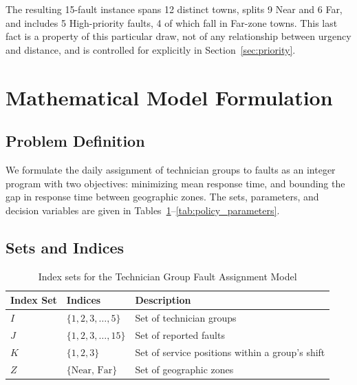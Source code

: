 \documentclass[11pt]{article}
\begin{document}
The resulting 15-fault instance spans 12 distinct towns, splits 9 Near and 6 Far, and includes 5 High-priority faults, 4 of which fall in Far-zone towns. This last fact is a property of this particular draw, not of any relationship between urgency and distance, and is controlled for explicitly in Section~\ref{sec:priority}.

\section*{Mathematical Model Formulation}

\subsection*{Problem Definition}
We formulate the daily assignment of technician groups to faults as an integer program with two objectives: minimizing mean response time, and bounding the gap in response time between geographic zones. The sets, parameters, and decision variables are given in Tables~\ref{tab:index_sets}--\ref{tab:policy_parameters}.

\subsection*{Sets and Indices}
\begin{table}[h!]
\centering
\caption{Index sets for the Technician Group Fault Assignment Model}
\label{tab:index_sets}
\begin{tabular}{l l l}
\toprule
\textbf{Index Set} & \textbf{Indices} & \textbf{Description} \\
\midrule
$I$ & $\{1, 2, 3, \dots, 5\}$ & Set of technician groups \\
$J$ & $\{1, 2, 3, \dots, 15\}$ & Set of reported faults \\
$K$ & $\{1, 2, 3\}$ & Set of service positions within a group's shift \\
$Z$ & $\{\text{Near, Far}\}$ & Set of geographic zones \\
\bottomrule
\end{tabular}
\end{table}
\end{document}
